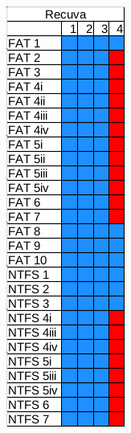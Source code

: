 \begin{figure}[h!]
\begin{subfigure}{0.3\linewidth}
    \end{subfigure}
    ~
    \begin{subfigure}{0.3\linewidth}
        \includegraphics[width=\linewidth]{fig/recuva_results.png}

\end{subfigure}
\end{figure}
